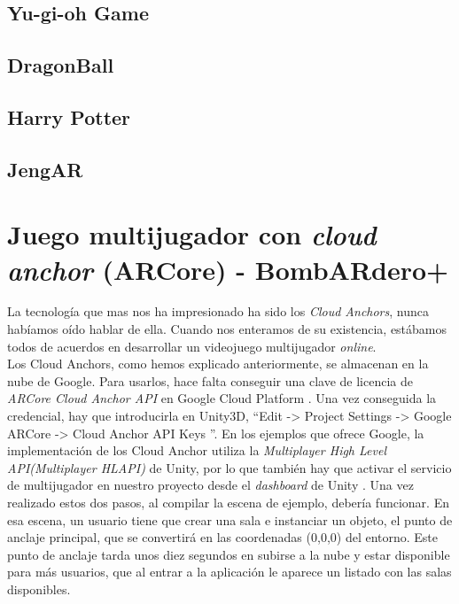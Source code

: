 \subsection{Yu-gi-oh Game}

\subsection{DragonBall}

\subsection{Harry Potter}

\subsection{JengAR}

\section{Juego multijugador con \textit{cloud anchor} (ARCore) - BombARdero+}
La tecnología que mas nos ha impresionado ha sido los \textit{Cloud Anchors}, nunca habíamos oído hablar de ella. Cuando nos enteramos de su existencia, estábamos todos de acuerdos en desarrollar un videojuego multijugador \textit{online}.\\

Los Cloud Anchors, como hemos explicado anteriormente, se almacenan en la nube de Google. Para usarlos, hace falta conseguir una clave de licencia de \textit{ARCore Cloud Anchor API} en Google Cloud Platform \cite{GCloud}. Una vez conseguida la credencial, hay que introducirla en Unity3D, ``Edit -> Project Settings -> Google ARCore -> Cloud Anchor API Keys ''. En los ejemplos que ofrece Google, la implementación de los Cloud Anchor utiliza la \textit{Multiplayer High Level API(Multiplayer HLAPI)} de Unity, por lo que también hay que activar el servicio de multijugador en nuestro proyecto desde el \textit{dashboard} de Unity \cite{UnityDashboard}. Una vez realizado estos dos pasos, al compilar la escena de ejemplo, debería funcionar. En esa escena, un usuario tiene que crear una sala e instanciar un objeto, el punto de anclaje principal, que se convertirá en las coordenadas (0,0,0) del entorno.
Este punto de anclaje tarda unos diez segundos en subirse a la nube y estar disponible para más usuarios, que al entrar a la aplicación le aparece un listado con las salas disponibles. \\

